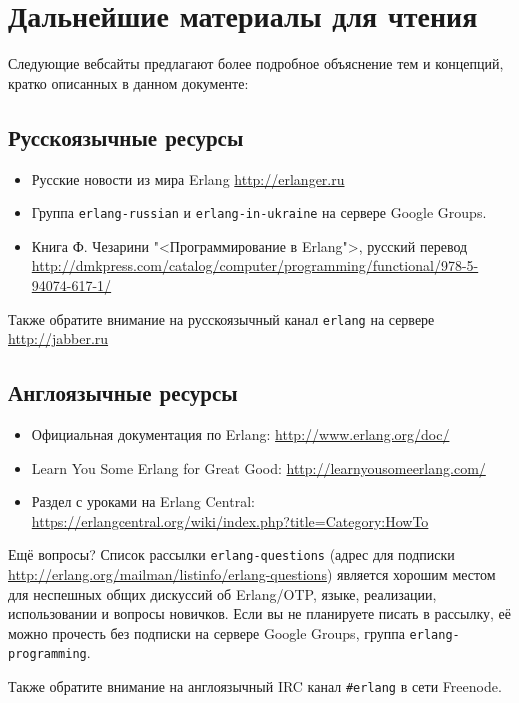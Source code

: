 \chapter{Дальнейшие материалы для чтения}

Следующие вебсайты предлагают более подробное объяснение тем и концепций, кратко
описанных в данном документе:

\section{Русскоязычные ресурсы}

\begin{itemize}
\item Русские новости из мира Erlang \url{http://erlanger.ru}
\item Группа \texttt{erlang-russian} и \texttt{erlang-in-ukraine} на сервере 
Google Groups.
\item Книга Ф. Чезарини "<Программирование в Erlang">, русский перевод
\url{http://dmkpress.com/catalog/computer/programming/functional/978-5-94074-617-1/}
\end{itemize}

Также обратите внимание на русскоязычный канал \texttt{erlang} на сервере 
\url{http://jabber.ru}

\section{Англоязычные ресурсы}

\begin{itemize}
\item Официальная документация по Erlang: \url{http://www.erlang.org/doc/}
\item Learn You Some Erlang for Great Good: \url{http://learnyousomeerlang.com/}
\item Раздел с уроками на Erlang Central: 
	\url{https://erlangcentral.org/wiki/index.php?title=Category:HowTo}
\end{itemize}

Ещё вопросы? Список рассылки \texttt{erlang-questions} (адрес для подписки
\url{http://erlang.org/mailman/listinfo/erlang-questions}) является хорошим местом
для неспешных общих дискуссий об Erlang/OTP, языке, реализации, использовании и
вопросы новичков. Если вы не планируете писать в рассылку, её можно прочесть без 
подписки на сервере Google Groups, группа \texttt{erlang-programming}.

Также обратите внимание на англоязычный IRC канал \texttt{\#erlang} в сети 
Freenode.
